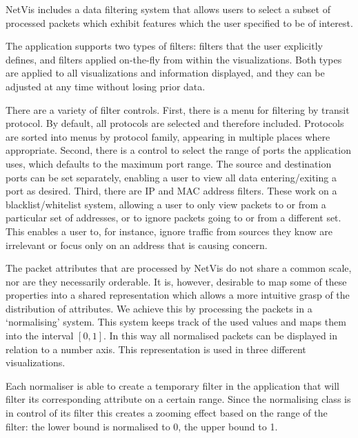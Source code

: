 NetVis includes a data filtering system that allows users to select a subset of processed packets which exhibit features which the user specified to be of interest.

The application supports two types of filters: filters that the user explicitly defines, and filters applied on-the-fly from within the visualizations.
Both types are applied to all visualizations and information displayed, and they can be adjusted at any time without losing prior data.

There are a variety of filter controls.  First, there is a menu for filtering by transit protocol. By default, all protocols are selected and therefore included. Protocols are sorted into menus by protocol family, appearing in multiple places where appropriate. Second, there is a control to select the range of ports the application uses, which defaults to the maximum port range.  The source and destination ports can be set separately, enabling a user to view all data entering/exiting a port as desired.  Third, there are IP and MAC address filters.  These work on a blacklist/whitelist system, allowing a user to only view packets to or from a particular set of addresses, or to ignore packets going to or from a different set.  This enables a user to, for instance, ignore traffic from sources they know are irrelevant or focus only on an address that is causing concern.

The packet attributes that are processed by NetVis do not share a common scale, nor are they necessarily orderable. It is, however, desirable to map some of these properties into a shared representation which allows a more intuitive grasp of the distribution of attributes. We achieve this by processing the packets in a `normalising' system. This system keeps track of the used values and maps them into the interval $[0,1]$. In this way all normalised packets can be displayed in relation to a number axis. This representation is used in three different visualizations.

Each normaliser is able to create a temporary filter in the application that will filter its corresponding attribute on a certain range.
Since the normalising class is in control of its filter this creates a zooming effect based on the range of the filter: the lower bound is normalised to 0, the upper bound to 1. 


